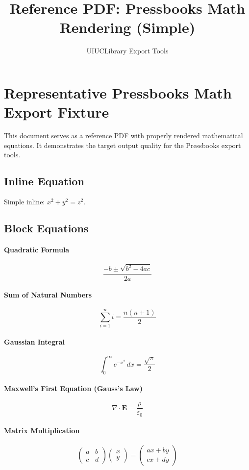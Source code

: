 \documentclass[12pt]{article}
\title{Reference PDF: Pressbooks Math Rendering (Simple)}
\author{UIUCLibrary Export Tools}
\date{}
\begin{document}
\maketitle

\section{Representative Pressbooks Math Export Fixture}

This document serves as a reference PDF with properly rendered mathematical equations.
It demonstrates the target output quality for the Pressbooks export tools.

\subsection{Inline Equation}
Simple inline: $x^2 + y^2 = z^2$.

\subsection{Block Equations}

\paragraph{Quadratic Formula}
\[
\frac{-b \pm \sqrt{b^2 - 4ac}}{2a}
\]

\paragraph{Sum of Natural Numbers}
\[
\sum_{i=1}^{n} i = \frac{n(n+1)}{2}
\]

\paragraph{Gaussian Integral}
\[
\int_0^{\infty} e^{-x^2}\,dx = \frac{\sqrt{\pi}}{2}
\]

\paragraph{Maxwell's First Equation (Gauss's Law)}
\[
\nabla \cdot \mathbf{E} = \frac{\rho}{\varepsilon_0}
\]

\paragraph{Matrix Multiplication}
\[
\begin{pmatrix} a & b \\ c & d \end{pmatrix} \begin{pmatrix} x \\ y \end{pmatrix} = \begin{pmatrix} ax+by \\ cx+dy \end{pmatrix}
\]
\end{document}
